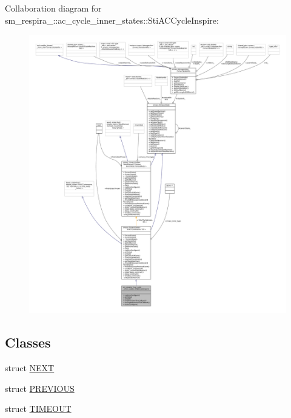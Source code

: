 Collaboration diagram for sm\+\_\+respira\+\_\+:\+:ac\+\_\+cycle\+\_\+inner\+\_\+states\+:\+:Sti\+A\+C\+Cycle\+Inspire\+:
\nopagebreak
\begin{figure}[H]
\begin{center}
\leavevmode
\includegraphics[width=350pt]{structsm__respira__1_1_1ac__cycle__inner__states_1_1StiACCycleInspire__coll__graph}
\end{center}
\end{figure}
\subsection*{Classes}
\begin{DoxyCompactItemize}
\item 
struct \hyperlink{structsm__respira__1_1_1ac__cycle__inner__states_1_1StiACCycleInspire_1_1NEXT}{N\+E\+XT}
\item 
struct \hyperlink{structsm__respira__1_1_1ac__cycle__inner__states_1_1StiACCycleInspire_1_1PREVIOUS}{P\+R\+E\+V\+I\+O\+US}
\item 
struct \hyperlink{structsm__respira__1_1_1ac__cycle__inner__states_1_1StiACCycleInspire_1_1TIMEOUT}{T\+I\+M\+E\+O\+UT}
\end{DoxyCompactItemize}
